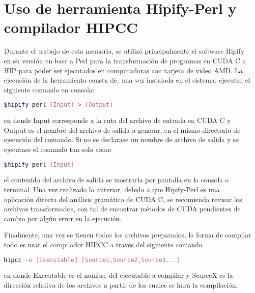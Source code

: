 \section{Uso de herramienta Hipify-Perl y compilador HIPCC}

Durante el trabajo de esta memoria, se utilizó principalmente el software Hipify en su versión en base a Perl para la transformación de programas en CUDA C a HIP para poder ser ejecutados en computadoras con tarjeta de video AMD.
La ejecución de la herramienta consta de, una vez instalada en el sistema, ejecutar el siguiente comando en consola:
\begin{lstlisting}[language=bash, breaklines=true]
$hipify-perl [Input] > [Output]
\end{lstlisting}
en donde Input corresponde a la ruta del archivo de entrada en CUDA C y Output es el nombre del archivo de salida a generar, en el mismo directorio de ejecución del comando.
Si no se declarase un nombre de archivo de salida y se ejecutase el comando tan solo como
\begin{lstlisting}[language=bash, breaklines=true]
$hipify-perl [Input]
\end{lstlisting}
el contenido del archivo de salida se mostraría por pantalla en la consola o terminal.
Una vez realizado lo anterior, debido a que Hipify-Perl es una aplicación directa del análisis gramático de CUDA C, se recomienda revisar los archivos transformados, con tal de encontrar métodos de CUDA pendientes de cambio por algún error en la ejecución.

Finalmente, una vez se tienen todos los archivos preparados, la forma de compilar todo es usar el compilador HIPCC a través del siguiente comando
\begin{lstlisting}[language=bash, breaklines=true]
hipcc -o [Executable] [Source1,Source2,Source3...]
\end{lstlisting}
en donde Executable es el nombre del ejecutable a compilar y SourceX es la dirección relativa de los archivos a partir de los cuales se hará la compilación. 